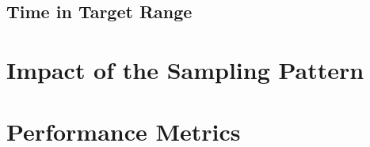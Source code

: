 \subsection{Time in Target Range}




\section{Impact of the Sampling Pattern}\label{sec:adversarial-analysis}


\section{Performance Metrics}\label{sec:performance-metric}




















